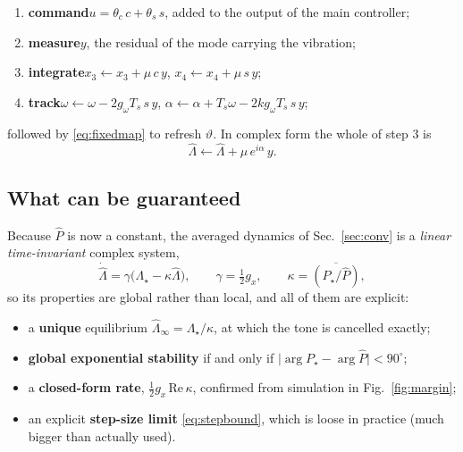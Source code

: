 \documentclass[11pt]{article}
\begin{document}
\begin{center}
\begin{minipage}{0.86\textwidth}
\begin{enumerate}\itemsep3pt
  \item \textbf{command}\quad $u=\theta_c\,c+\theta_s\,s$, added to the output of the main controller;
  \item \textbf{measure}\quad $y$, the residual of the mode carrying the vibration;
  \item \textbf{integrate}\quad $x_3\leftarrow x_3+\mu\,c\,y$, \qquad $x_4\leftarrow x_4+\mu\,s\,y$;
  \item \textbf{track}\quad $\omega\leftarrow\omega-2g_\omega T_s\,s\,y$, \qquad
        $\alpha\leftarrow\alpha+T_s\omega-2kg_\omega T_s\,s\,y$;
\end{enumerate}
\end{minipage}
\end{center}
\noindent
followed by \eqref{eq:fixedmap} to refresh $\vartheta$.
%
%
In complex form the whole of step 3 is
%
\begin{equation}
  \hat\Lambda\leftarrow\hat\Lambda+\mu\,e^{i\alpha}\,y .
  \label{eq:simpleint}
\end{equation}
%

\subsection{What can be guaranteed}

Because $\hat P$ is now a constant, the averaged dynamics of Sec.~\ref{sec:conv} is a \emph{linear time-invariant} complex system,
%
\begin{equation}
  \dot{\hat\Lambda}=\gamma\big(\Lambda_\star-\kappa\hat\Lambda\big),
  \qquad \gamma=\tfrac12 g_x,
  \qquad \kappa=\overline{\left(P_\star/\hat P\right)} ,
  \label{eq:simpledyn}
\end{equation}
%
so its properties are global rather than local, and all of them are explicit:

\begin{itemize}\itemsep2pt
  \item a \textbf{unique} equilibrium $\hat\Lambda_\infty=\Lambda_\star/\kappa$, at which the tone is cancelled exactly;
  \item \textbf{global exponential stability} if and only if $\big|\arg P_\star-\arg\hat P\big|<90^\circ$;
  \item a \textbf{closed-form rate}, $\tfrac12 g_x\,\mathrm{Re}\,\kappa$, confirmed from simulation in Fig.~\ref{fig:margin};
  \item an explicit \textbf{step-size limit} \eqref{eq:stepbound}, which is loose in practice (much bigger than actually used).
\end{itemize}
\end{document}
